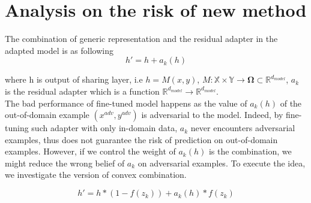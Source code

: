 \documentclass[12pt,a4paper,twoside]{report}
\theoremstyle{definition}
\begin{document}
\section*{Analysis on the risk of new method}

The combination of generic representation and the residual adapter in the adapted model is as following
\begin{equation}
h' = h + a_k(h)
\label{eq:1}
\end{equation}

where h is output of sharing layer, i.e $h=M(x,y)$, $M: \mathbb{X} \times \mathbb{Y} \rightarrow \mathbf{\Omega}\subset \mathbb{R}^{d_{model}}$, $a_k$ is the residual adapter which is a function $\mathbb{R}^{d_{model}} \rightarrow \mathbb{R}^{d_{model}}$. \\

The bad performance of fine-tuned model happens as the value of $a_k(h)$ of the out-of-domain example $(x^{adv}, y^{adv})$ is adversarial to the model. Indeed, by fine-tuning such adapter with only in-domain data, $a_k$ never encounters adversarial examples, thus does not guarantee the risk of prediction on out-of-domain examples. However, if we control the weight of $a_k(h)$ is the combination, we might reduce the wrong belief of $a_k$ on adversarial examples. To execute the idea, we  investigate the version of convex combination.

\begin{equation}
h' = h * (1-f(z_k)) + a_k(h) * f(z_k)
\label{eq:2}
\end{equation}
\end{document}
